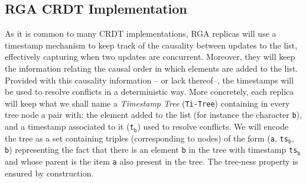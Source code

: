 \subsection{RGA CRDT Implementation}
\label{sec:rga-crdt-impl}

As it is common to many CRDT implementations, RGA replicas will use
a timestamp mechanism to keep track of the causality between updates
to the list, effectively capturing when two updates are concurrent.
Moreover, they will keep the information relating the causal order
in which elements are added to the list.
%
Provided with this causality information -- or lack thereof--, the
timestamps will be used to resolve conflicts in a deterministic way.
%
More concretely, each replica will keep what we shall name a
\emph{Timestamp Tree} (\lstinline|Ti-Tree|) containing in every tree
node a pair with: the element added to the list (for instance the
character \lstinline|b|), and a timestamp associated to it
(\lstinline|t|$_{\mathtt{b}}$) used to resolve conflicts.
%
We will encode the tree as a set containing triples (corresponding to
nodes) of the form (\lstinline|a|, \lstinline|ts|$_{\mathtt{b}}$, \lstinline|b|)
representing the fact that there is an element \lstinline|b| in the
tree with timestamp \lstinline|ts|$_{\mathtt{b}}$ and whose parent is
the item \lstinline|a| also present in the tree.
%
The tree-ness property is ensured by construction.


